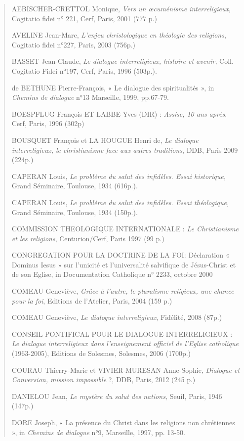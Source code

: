 \begin{quote}
AEBISCHER-CRETTOL Monique, \emph{Vers un œcuménisme interreligieux},
Cogitatio fidei n° 221, Cerf, Paris, 2001 (777 p.)

AVELINE Jean-Marc, \emph{L'enjeu christologique en théologie des
religions}, Cogitatio fidei n°227, Paris, 2003 (756p.)

BASSET Jean-Claude, \emph{Le dialogue interreligieux, histoire et
avenir,} Coll. Cogitatio Fidei n°197, Cerf, Paris, 1996 (503p.).

de BETHUNE Pierre-François, « Le dialogue des spiritualités », in
\emph{Chemins de dialogue} n°13 Marseille, 1999, pp.67-79.

BOESPFLUG François ET LABBE Yves (DIR) : \emph{Assise, 10 ans après},
Cerf, Paris, 1996 (302p)

BOUSQUET François et LA HOUGUE Henri de, \emph{Le dialogue
interreligieux, le christianisme face aux autres traditions}, DDB, Paris
2009 (224p.)

CAPERAN Louis, \emph{Le problème du salut des infidèles. Essai
historique,} Grand Séminaire, Toulouse, 1934 (616p.).

CAPERAN Louis, \emph{Le problème du salut des infidèles. Essai
théologique,} Grand Séminaire, Toulouse, 1934 (150p.).

COMMISSION THEOLOGIQUE INTERNATIONALE : \emph{Le Christianisme et les
religions}, Centurion/Cerf, Paris 1997 (99 p.)

CONGREGATION POUR LA DOCTRINE DE LA FOI: Déclaration « Dominus Iesus »
sur l'unicité et l'universalité salvifique de Jésus-Christ et de son
Eglise, in Documentation Catholique n° 2233, octobre 2000

COMEAU Geneviève, \emph{Grâce à l'autre, le pluralisme religieux, une
chance pour la foi}, Editions de l'Atelier, Paris, 2004 (159 p.)

COMEAU Geneviève, \emph{Le dialogue interreligieux}, Fidélité, 2008
(87p.)

CONSEIL PONTIFICAL POUR LE DIALOGUE INTERRELIGIEUX : \emph{Le dialogue
interreligieux dans l'enseignement officiel de l'Eglise catholique}
(1963-2005), Editions de Solesmes, Solesmes, 2006 (1700p.)

COURAU Thierry-Marie et VIVIER-MURESAN Anne-Sophie, \emph{Dialogue et
Conversion, mission impossible} ?, DDB, Paris, 2012 (245 p.)

DANIELOU Jean, \emph{Le mystère du salut des nations,} Seuil, Paris,
1946 (147p.)

DORE Joseph, « La présence du Christ dans les religions non chrétiennes
», in \emph{Chemins de dialogue} n°9, Marseille, 1997, pp. 13-50.


\end{quote}
